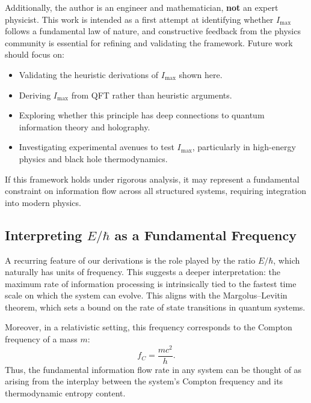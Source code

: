\documentclass[12pt]{article}
\begin{document}
Additionally, the author is an engineer and mathematician, \textbf{not} an expert physicist. This work is intended as a first attempt at identifying whether $I_{\max}$ follows a fundamental law of nature, and constructive feedback from the physics community is essential for refining and validating the framework. Future work should focus on:
\begin{itemize}
    \item Validating the heuristic derivations of $I_{\max}$ shown here.
    \item Deriving $I_{\max}$ from QFT rather than heuristic arguments.
    \item Exploring whether this principle has deep connections to quantum information theory and holography.
    \item Investigating experimental avenues to test $I_{\max}$, particularly in high-energy physics and black hole thermodynamics.
\end{itemize}
If this framework holds under rigorous analysis, it may represent a fundamental constraint on information flow across all structured systems, requiring integration into modern physics.

\subsection{Interpreting \(E / \hbar\) as a Fundamental Frequency}

A recurring feature of our derivations is the role played by the ratio \(E / \hbar\), which naturally has units of frequency. This suggests a deeper interpretation: the maximum rate of information processing is intrinsically tied to the fastest time scale on which the system can evolve. This aligns with the Margolus–Levitin theorem, which sets a bound on the rate of state transitions in quantum systems.

Moreover, in a relativistic setting, this frequency corresponds to the Compton frequency of a mass \(m\):
\begin{equation}
    f_C = \frac{m c^2}{h}.
\end{equation}
Thus, the fundamental information flow rate in any system can be thought of as arising from the interplay between the system’s Compton frequency and its thermodynamic entropy content.
\end{document}
